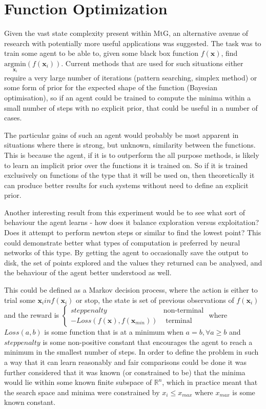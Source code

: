 \section{Function Optimization}
Given the vast state complexity present within MtG, an alternative avenue of research with potentially more useful applications was suggested. The task was to train some agent to be able to, given some black box function $f(\boldsymbol{x})$, find $\underset{\boldsymbol{x}_i}{\text{argmin}} (f(\boldsymbol{x}_i))$. Current methods that are used for such situations either require a very large number of iterations (pattern searching, simplex method) or some form of prior for the expected shape of the function (Bayesian optimisation), so if an agent could be trained to compute the minima within a small number of steps with no explicit prior, that could be useful in a number of cases.

The particular gains of such an agent would probably be most apparent in situations where there is strong, but unknown, similarity between the functions. This is because the agent, if it is to outperform the all purpose methods, is likely to learn an implicit prior over the functions it is trained on. So if it is trained exclusively on functions of the type that it will be used on, then theoretically it can produce better results for such systems without need to define an explicit prior.

Another interesting result from this experiment would be to see what sort of behaviour the agent learns - how does it balance exploration versus exploitation? Does it attempt to perform newton steps or similar to find the lowest point? This could demonstrate better what types of computation is preferred by neural networks of this type. By getting the agent to occasionally save the output to disk, the set of points explored and the values they returned can be analysed, and the behaviour of the agent better understood as well.

This could be defined as  a Markov decision process, where the action is either to trial some $\boldsymbol{x}_i in f(\boldsymbol{x}_i)$ or stop, the state is set of previous observations of $f(\boldsymbol{x}_i)$ and the reward is $\begin{cases}
 step penalty&  \text{non-terminal} \\
-Loss(f(\boldsymbol{x}), f(\boldsymbol{x}_{min})) & \text{ terminal}
\end{cases} $ where $Loss(a,b)$ is some function that is at a minimum when $a = b, \forall a \geq b$ and $step penalty$ is some non-positive constant that encourages the agent to reach a minimum in the smallest number of steps. 
In order to define the problem in such a way that it can learn reasonably and fair comparisons could be done it was further considered that it was known (or constrained to be) that the minima would lie within some known finite subspace of $\mathbb{R}^n$, which in practice meant that the search space and minima were constrained by $x_i \leq x_{max}$ where $x_{max}$ is some known constant.

